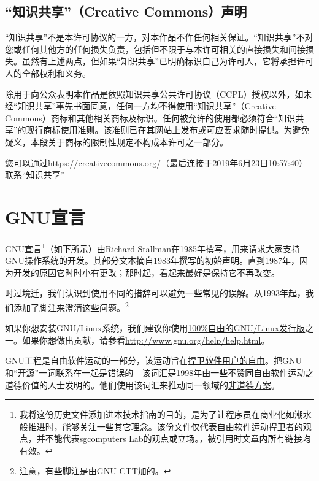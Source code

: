 \documentclass{book}
\begin{document}
\section{“知识共享”（Creative Commons）声明}
“知识共享”不是本许可协议的一方，对本作品不作任何相关保证。“知识共享”不对您或任何其他方的任何损失负责，包括但不限于与本许可相关的直接损失和间接损失。虽然有上述两点，但如果“知识共享”已明确标识自己为许可人，它将承担许可人的全部权利和义务。\par
除用于向公众表明本作品是依照知识共享公共许可协议（CCPL）授权以外，如未经“知识共享”事先书面同意，任何一方均不得使用“知识共享”（Creative Commons）商标和其他相关商标及标识。任何被允许的使用都必须符合“知识共享”的现行商标使用准则。该准则已在其网站上发布或可应要求随时提供。为避免疑义，本段关于商标的限制性规定不构成本许可之一部分。\par
您可以通过\url{https://creativecommons.org/}（最后连接于2019年6月23日10:57:40）联系“知识共享”
\chapter{GNU宣言}
GNU宣言\footnote{我将这份历史文件添加进本技术指南的目的，是为了让程序员在商业化如潮水般推进时，能够关注一些其它理念。该份文件仅代表自由软件运动捍卫者的观点，并不能代表sgcomputers Lab的观点或立场。\cite{gnum}，被引用时文章内所有链接均有效。}（如下所示）由\href{http://www.stallman.org/}{Richard Stallman}在1985年撰写，用来请求大家支持GNU操作系统的开发。其部分文本摘自1983年撰写的初始声明。直到1987年，因为开发的原因它时时小有更改；那时起，看起来最好是保持它不再改变。\par
时过境迁，我们认识到使用不同的措辞可以避免一些常见的误解。从1993年起，我们添加了脚注来澄清这些问题。\footnote{注意，有些脚注是由GNU CTT加的。}\par
如果你想安装GNU/Linux系统，我们建议你使用\href{http://www.gnu.org/distros}{100\%自由的GNU/Linux发行版}之一。如果你想做出贡献，请参看\url{http://www.gnu.org/help/help.html}。\par
GNU工程是自由软件运动的一部分，该运动旨在\href{http://www.gnu.org/philosophy/free-sw.html}{捍卫软件用户的自由}。把GNU和“开源”一词联系在一起是错误的—该词汇是1998年由一些不赞同自由软件运动之道德价值的人士发明的。他们使用该词汇来推动同一领域的\href{http://www.gnu.org/philosophy/open-source-misses-the-point.html}{非道德方案}。\par
\end{document}
